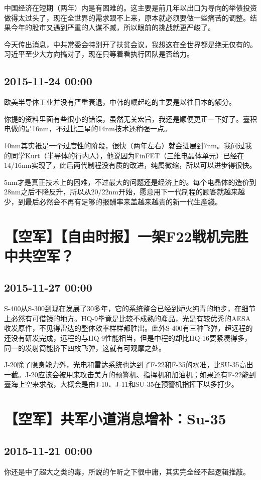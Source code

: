 \documentclass[twocolumn]{ctexart}
\begin{document}
中国经济在短期（两年）内是有困难的。这主要是前几年以出口为导向的举债投资做得太过头了，现在全世界的需求跟不上来，原本就必须要做一些痛苦的调整。结果今年的股市又遇到严重的人谋不臧，所以眼前的挑战就更严峻了。

今天传出消息，中共常委会特别开了扶贫会议，我想这在全世界都是绝无仅有的。习近平至少大方向搞对了，现在只等着看执行团队是否给力。\subsection*{2015-11-24 00:00}
欧美半导体工业并没有严重衰退，中韩的崛起吃的主要是以往日本的额分。

你提的资料里面有些很小的错误，虽然无关宏旨，我还是顺便更正一下好了。臺积电做的是16nm，不过比三星的14nm技术还稍强一点。

10nm其实衹是一个过度性的阶段，很快（两年左右）就会进展到7nm。我问过我的同学Kurt（半导体的行内人），他说因为FinFET（三维电晶体单元）已经在14/16nm实现了，此后两代制程没有质的改进，纯属微缩，所以可以进步得很快。

5nm才是真正技术上的困难，不过最大的问题还是经济上的。每个电晶体的造价到28nm之后不降反升，所以从20/22nm开始，愿意用下一代制程的顾客就越来越少，到最后必然会不再有足够的报酬率来盖越来越贵的新一代生產綫。\section*{【空军】【自由时报】一架F22戦机完胜中共空军？}
\subsection*{2015-11-27 00:00}
S-400从S-300到现在发展了30多年，它的系统整合已经到炉火纯青的地步，在细节上必然有可借镜的地方。HQ-9毕竟是比较不成熟的產品，光是有较优秀的AESA收发原件，不见得雷达的整体效率样样都胜出。此外S-400有三种飞弹，超远程的还没有研发完成，远程的与HQ-9性能相当，但是中程的却比HQ-16要紧凑得多，同一的发射筒能挤下四枚飞弹，这就有可观摩之处。

J-20除了隐身能力外，光电和雷达系统也达到了F-22和F-35的水准，比SU-35高出一截。J-20应该会被用来攻击美方的预警机、指挥机和加油机；如果还有F-22能到臺海上空来求战，大概会是由J-10、J-11和SU-35在预警机指挥下以多打少。\section*{【空军】共军小道消息增补：Su-35}
\subsection*{2015-11-21 00:00}
你还是中了超大之类的毒，所説的乍听之下很中庸，其实完全经不起逻辑推敲。
\end{document}
